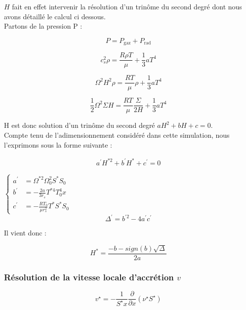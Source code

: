   $H$ fait en effet intervenir la résolution d'un trinôme du second degré dont nous avons détaillé le calcul ci dessous. \\

Partons de la pression P : 

\begin{equation}
	P = P_\textrm{gaz} + P_\textrm{rad}
\end{equation}


\begin{equation}
	c_{s}^{2} \rho = \frac{R \rho T}{\mu} + \frac{1}{3} a T^{4}
\end{equation}


\begin{equation}
	\Omega^{2} H^{2} \rho = \frac{R T}{\mu} \rho + \frac{1}{3} a T^{4}
\end{equation}


\begin{equation}
	\frac{1}{2} \Omega^{2} \Sigma H = \frac{R T}{\mu} \frac{\Sigma}{2 H} + \frac{1}{3} a T^{4}
\end{equation}

H est donc solution d'un trinôme du second degré $ a H^{2} + b H + c = 0$. \\
Compte tenu de l'adimensionnement considéré dans cette simulation, nous l'exprimons sous la forme suivante :  

\begin{eqnarray}
  a^{\prime} H^{* 2}+b^{\prime}H^{*}+c^{\prime}=0
  \end{eqnarray}

$\begin{cases}  
      a^{\prime} &= \Omega^{*2} \Omega_{0}^{2} S^{*} S_{0}\\
      b^{\prime} &= - \frac{2 a}{3 r_{s}} T^{*4} T_{0}^{4} x \\
      c^{\prime}&=-\frac{RT_{0}}{\mu r_{s}^{2}} T^{*} S^{*} S_{0}
     \end{cases}$ \\


\begin{equation}
	\Delta^{\prime} = b^{\prime 2} - 4a^{\prime}c^{\prime}
\end{equation} 

Il vient donc : 

\begin{equation}
	H^{*} = \frac{-b -sign(b) \sqrt{\Delta}}{2a}
\end{equation}


\subsubsection{Résolution de la vitesse locale d'accrétion $v$}
\begin{equation}
    v^\star = - \frac{1}{S^\star x} \frac{\partial}{\partial x} \left(\nu^\star S^\star\right)
\end{equation} 

